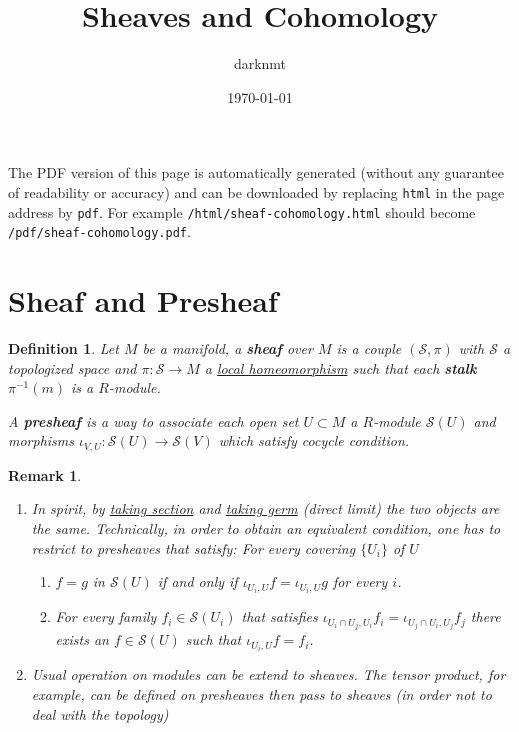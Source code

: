 \documentclass[11pt]{article}
\author{darknmt}
\date{\today}
\title{Sheaves and Cohomology}
\newtheorem{remark}{Remark}
\newtheorem{definition}{Definition}
\begin{document}
\maketitle
\tableofcontents

\begin{info}
The PDF version of this page is automatically generated (without any guarantee of
readability or accuracy) and can be downloaded by replacing \texttt{html} in the page address by
\texttt{pdf}. 
For example \texttt{/html/sheaf-cohomology.html} should become \texttt{/pdf/sheaf-cohomology.pdf}.
\end{info}


\section{Sheaf and Presheaf}
\label{sec:org89ea00e}
\begin{definition}
Let \(M\) be a manifold, a \textbf{sheaf} over \(M\) is a couple \((\mathcal{S}, \pi)\) with \(\mathcal{S}\) a topologized space and \(\pi: \mathcal{S}\longrightarrow M\) a \uline{local
homeomorphism} such that each \textbf{stalk} \(\pi^{-1}(m)\) is a \(R\)-module.

A \textbf{presheaf} is a way to associate each open set \(U\subset M\) a \(R\)-module \(\mathcal{S}(U)\) and morphisms \(\iota_{V,U}: \mathcal{S}(U) \longrightarrow
\mathcal{S}(V)\) which satisfy cocycle condition.
\end{definition}

\begin{remark}
\begin{enumerate}
\item In spirit, by \uline{taking section} and \uline{taking germ} (direct limit) the two objects are the
same. Technically, in order to obtain an equivalent condition, one has to restrict to
presheaves that satisfy: For every covering \(\{U_i\}\) of \(U\)
\begin{enumerate}
\item \(f=g\) in \(\mathcal{S}(U)\) if and only if \(\iota_{U_i, U} f = \iota_{U_i, U} g\) for every \(i\).
\item For every family \(f_i \in \mathcal{S}(U_i)\) that satisfies \(\iota_{U_i\cap
      U_j, U_i}f_i = \iota_{U_j\cap U_i, U_j}f_j\) there exists an \(f \in
      \mathcal{S}(U)\) such that \(\iota_{U_i,U} f = f_i\).
\end{enumerate}
\item Usual operation on modules can be extend to sheaves. The tensor product, for example,
can be defined on presheaves then pass to sheaves (in order not to deal with the
topology)
\end{enumerate}
\end{remark}
\end{document}
